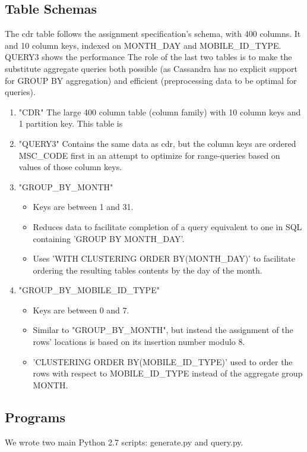 \documentclass[letterpaper]{article}
\begin{document}
\subsection{Table Schemas}
The cdr table follows the assignment specification's schema, with 400 columns.
It 
and 10 column keys, indexed on MONTH\_DAY and MOBILE\_ID\_TYPE. QUERY3 shows the
performance 
The role of the last two
tables is to make the substitute
aggregate queries both possible (as Cassandra has no
explicit support for GROUP BY aggregation) and
efficient (preprocessing data to be optimal for
queries).
\begin{enumerate}
	\item "CDR"
		The large 400 column table (column family) with 10
		column keys and 1 partition key. This table is 

	\item "QUERY3"
		Contains the same data as cdr, but the column keys are
		ordered MSC\_CODE first in an attempt to optimize for
		range-queries based on values of those column keys.
	\item "GROUP\_BY\_MONTH" 
		\begin{itemize}
			\item Keys are between 1 and 31.
			\item Reduces data to facilitate completion of
				a query equivalent to one in SQL
				containing 'GROUP BY MONTH\_DAY'.
			\item Uses 'WITH CLUSTERING ORDER
				BY(MONTH\_DAY)' to facilitate ordering
				the resulting tables contents by the
				day of the month.  
		\end{itemize}
	\item "GROUP\_BY\_MOBILE\_ID\_TYPE"
		\begin{itemize}
			\item Keys are between 0 and 7.
			\item Similar to "GROUP\_BY\_MONTH", but instead
				the assignment of the rows' locations
				is based on its insertion number modulo
				8.
			\item 'CLUSTERING ORDER BY(MOBILE\_ID\_TYPE)'
				used to order the rows with respect to
				MOBILE\_ID\_TYPE instead of the aggregate
				group MONTH.
		\end{itemize}
\end{enumerate}

\subsection{Programs}
We wrote two main Python 2.7 scripts: generate.py and query.py.
\end{document}
